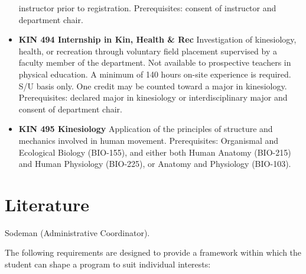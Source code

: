 \documentclass[
  letterpaper,
]{scrbook}
\begin{document}
\begin{itemize}
  instructor prior to registration. Prerequisites: consent of instructor
  and department chair.
\item
  \textbf{KIN 494 Internship in Kin, Health \& Rec} Investigation of
  kinesiology, health, or recreation through voluntary field placement
  supervised by a faculty member of the department. Not available to
  prospective teachers in physical education. A minimum of 140 hours
  on-site experience is required. S/U basis only. One credit may be
  counted toward a major in kinesiology. Prerequisites: declared major
  in kinesiology or interdisciplinary major and consent of department
  chair.
\item
  \textbf{KIN 495 Kinesiology} Application of the principles of
  structure and mechanics involved in human movement. Prerequisites:
  Organismal and Ecological Biology (BIO-155), and either both Human
  Anatomy (BIO-215) and Human Physiology (BIO-225), or Anatomy and
  Physiology (BIO-103).
\end{itemize}

\section{Literature}\label{sec-literature}

Sodeman (Administrative Coordinator).

The following requirements are designed to provide a framework within
which the student can shape a program to suit individual interests:
\end{document}
